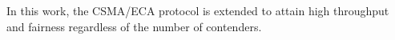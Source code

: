 
In this work, the CSMA/ECA protocol is extended to attain high throughput and fairness regardless of the number of contenders.

